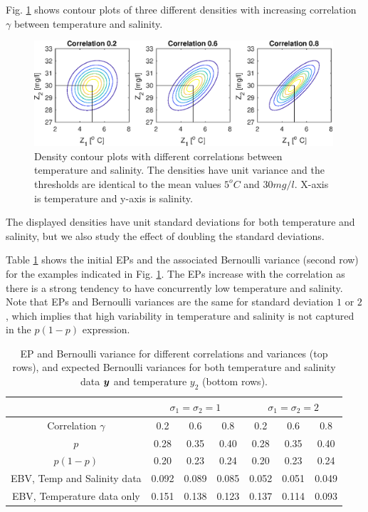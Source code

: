 \documentclass[aoas]{imsart}
\begin{document}
Fig. \ref{illus_bivarDens} shows contour plots of three different
densities with increasing correlation $\gamma$ between temperature and
salinity. 
\begin{figure}[h!] \centering
  \includegraphics[width=0.99\textwidth]{Figures/illus_bivarZ.eps}
  \caption{Density contour plots with different correlations between
    temperature and salinity. The densities have unit variance and the
    thresholds are identical to the mean values $5^o C$ and
    $30 mg/l$. X-axis is temperature and y-axis is salinity.}
\label{illus_bivarDens}
\end{figure}
The displayed densities have unit standard deviations for both
temperature and salinity, but we also study the effect of doubling the
standard deviations.

Table \ref{tab:sim_rhoab} shows the initial EPs and the associated
Bernoulli variance (second row) for the examples indicated in Fig.
\ref{illus_bivarDens}. The EPs increase with the correlation as there
is a strong tendency to have concurrently low temperature and salinity. Note that EPs and Bernoulli variances are the same for standard
deviation $1$ or $2$, which implies that high variability in
temperature and salinity is not captured in the $p(1-p)$ expression.

\begin{table}[!h] \centering \caption{EP and Bernoulli variance for
    different correlations and variances (top rows), and expected
    Bernoulli variances for both temperature and salinity data ${\boldsymbol y}$ and 
    temperature $y_2$ (bottom rows).}
  \begin{tabular}{c|ccc|ccc}
 &\multicolumn{3}{c}{$\sigma_1=\sigma_2=1$} & \multicolumn{3}{c}{$\sigma_1=\sigma_2=2$} \\
\hline
Correlation $\gamma$ & 0.2 & 0.6 & 0.8 & 0.2 & 0.6 & 0.8 \\
\hline
$p$ & 0.28 & 0.35 & 0.40 & 0.28 & 0.35 & 0.40 \\ 
$p(1-p)$ & 0.20 & 0.23 & 0.24 & 0.20 & 0.23 & 0.24 \\ 
EBV, Temp and Salinity data & 0.092 & 0.089 & 0.085 & 0.052 & 0.051 & 0.049 \\ 
EBV, Temperature data only & 0.151 & 0.138 & 0.123 & 0.137 & 0.114 & 0.093 \\ 
\hline
\end{tabular}
\label{tab:sim_rhoab}
\end{table}
\end{document}
